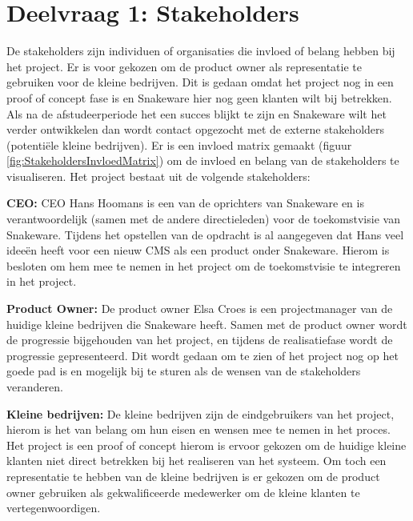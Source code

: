\section{Deelvraag 1: Stakeholders}
\label{sec:Stakeholders}
De stakeholders zijn individuen of organisaties die invloed of belang hebben bij het project.
Er is voor gekozen om de product owner als representatie te gebruiken voor de kleine bedrijven.
Dit is gedaan omdat het project nog in een proof of concept fase is en Snakeware hier nog geen klanten wilt bij betrekken.
Als na de afstudeerperiode het een succes blijkt te zijn en Snakeware wilt het verder ontwikkelen dan wordt contact opgezocht met de externe stakeholders (potentiële kleine bedrijven).
Er is een invloed matrix gemaakt (figuur \ref{fig:StakeholdersInvloedMatrix}) om de invloed en belang van de stakeholders te visualiseren.
Het project bestaat uit de volgende stakeholders:

\whitespace
\textbf{CEO:}
CEO Hans Hoomans is een van de oprichters van Snakeware en is verantwoordelijk (samen met de andere directieleden) voor de toekomstvisie van Snakeware.
Tijdens het opstellen van de opdracht is al aangegeven dat Hans veel ideeën heeft voor een nieuw \gls{CMS} als een product onder Snakeware.
Hierom is besloten om hem mee te nemen in het project om de toekomstvisie te integreren in het project.

\whitespace
\textbf{Product Owner:}
De product owner Elsa Croes is een projectmanager van de huidige kleine bedrijven die Snakeware heeft.
Samen met de product owner wordt de progressie bijgehouden van het project, en tijdens de realisatiefase wordt de progressie gepresenteerd.
Dit wordt gedaan om te zien of het project nog op het goede pad is en mogelijk bij te sturen als de wensen van de stakeholders veranderen.

\whitespace
\textbf{Kleine bedrijven:}
De kleine bedrijven zijn de eindgebruikers van het project, hierom is het van belang om hun eisen en wensen mee te nemen in het proces.
Het project is een proof of concept hierom is ervoor gekozen om de huidige kleine klanten niet direct betrekken bij het realiseren van het systeem.
Om toch een representatie te hebben van de kleine bedrijven is er gekozen om de product owner gebruiken als gekwalificeerde medewerker om de kleine klanten te vertegenwoordigen.%

